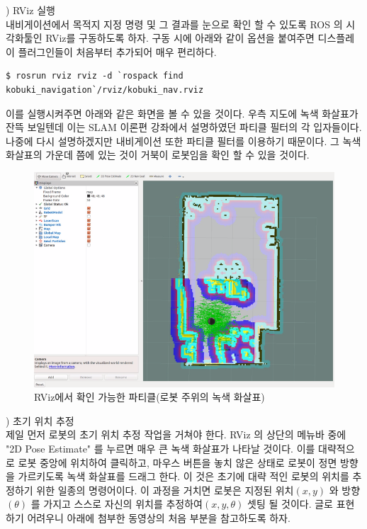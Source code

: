 \vspace{\baselineskip}
\noindent
{}
\thenum) RViz 실행\\

내비게이션에서 목적지 지정 명령 및 그 결과를 눈으로 확인 할 수 있도록 ROS 의 시각화툴인 RViz를 구동하도록 하자. 구동 시에 아래와 같이 옵션을 붙여주면 디스플레이 플러그인들이 처음부터 추가되어 매우 편리하다.

\vspace{\baselineskip}
\begin{lstlisting}[language=ROS]
$ rosrun rviz rviz -d `rospack find kobuki_navigation`/rviz/kobuki_nav.rviz
\end{lstlisting}

이를 실행시켜주면 아래와 같은 화면을 볼 수 있을 것이다. 우측 지도에 녹색 화살표가 잔뜩 보일텐데 이는 SLAM 이론편 강좌에서 설명하였던 파티클 필터의 각 입자들이다. 나중에 다시 설명하겠지만 내비게이션 또한 파티클 필터를 이용하기 때문이다. 그 녹색 화살표의 가운데 쯤에 있는 것이 거북이 로봇임을 확인 할 수 있을 것이다.

\begin{figure}[h]
\centering
\includegraphics[width=0.9\columnwidth]{pictures/chapter11/navigation_rviz.png}
\caption{RViz에서 확인 가능한 파티클(로봇 주위의 녹색 화살표)}
\end{figure}

\vspace{\baselineskip}
\noindent
{}
\thenum) 초기 위치 추정\\
제일 먼저 로봇의 초기 위치 추정 작업을 거쳐야 한다. RViz 의 상단의 메뉴바 중에 "2D Pose Estimate" 를 누르면 매우 큰 녹색 화살표가 나타날 것이다. 이를 대략적으로 로봇 중앙에 위치하여 클릭하고, 마우스 버튼을 놓치 않은 상태로 로봇이 정면 방향을 가르키도록 녹색 화살표를 드래그 한다. 이 것은 초기에 대략 적인 로봇의 위치를 추정하기 위한 일종의 명령어이다. 이 과정을 거치면 로봇은 지정된 위치$(x,y)$ 와 방향$(θ)$ 를 가지고 스스로 자신의 위치를 추정하여$(x, y, θ)$ 셋팅 될 것이다. 글로 표현하기 어려우니 아래에 첨부한 동영상의 처음 부분을 참고하도록 하자.

